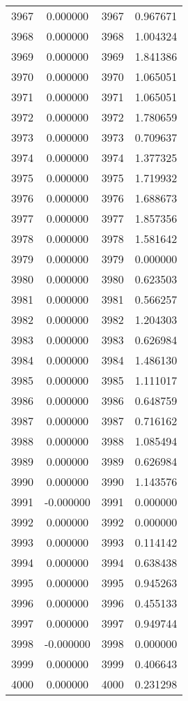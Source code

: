 \documentclass[12pt]{article}
\begin{document}
\begin{longtable}{@{}cccc@{}}
3967 & 0.000000 & 3967 & 0.967671 \\
3968 & 0.000000 & 3968 & 1.004324 \\
3969 & 0.000000 & 3969 & 1.841386 \\
3970 & 0.000000 & 3970 & 1.065051 \\
3971 & 0.000000 & 3971 & 1.065051 \\
3972 & 0.000000 & 3972 & 1.780659 \\
3973 & 0.000000 & 3973 & 0.709637 \\
3974 & 0.000000 & 3974 & 1.377325 \\
3975 & 0.000000 & 3975 & 1.719932 \\
3976 & 0.000000 & 3976 & 1.688673 \\
3977 & 0.000000 & 3977 & 1.857356 \\
3978 & 0.000000 & 3978 & 1.581642 \\
3979 & 0.000000 & 3979 & 0.000000 \\
3980 & 0.000000 & 3980 & 0.623503 \\
3981 & 0.000000 & 3981 & 0.566257 \\
3982 & 0.000000 & 3982 & 1.204303 \\
3983 & 0.000000 & 3983 & 0.626984 \\
3984 & 0.000000 & 3984 & 1.486130 \\
3985 & 0.000000 & 3985 & 1.111017 \\
3986 & 0.000000 & 3986 & 0.648759 \\
3987 & 0.000000 & 3987 & 0.716162 \\
3988 & 0.000000 & 3988 & 1.085494 \\
3989 & 0.000000 & 3989 & 0.626984 \\
3990 & 0.000000 & 3990 & 1.143576 \\
3991 & -0.000000 & 3991 & 0.000000 \\
3992 & 0.000000 & 3992 & 0.000000 \\
3993 & 0.000000 & 3993 & 0.114142 \\
3994 & 0.000000 & 3994 & 0.638438 \\
3995 & 0.000000 & 3995 & 0.945263 \\
3996 & 0.000000 & 3996 & 0.455133 \\
3997 & 0.000000 & 3997 & 0.949744 \\
3998 & -0.000000 & 3998 & 0.000000 \\
3999 & 0.000000 & 3999 & 0.406643 \\
4000 & 0.000000 & 4000 & 0.231298 \\

\end{longtable}
\end{document}
